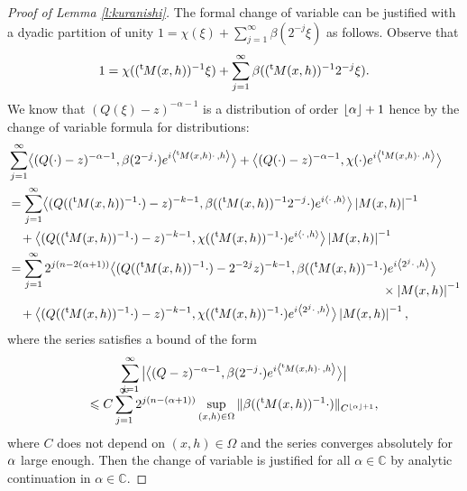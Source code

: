 \documentclass[10pt]{amsart}
\theoremstyle{definition}
\newenvironment{refproof}[1]{\begin{proof}[Proof of {#1}]}{\end{proof}}
\let\cv\alpha
\let\Re\relax
\DeclareMathOperator{\Re}{Re}
\newcommand{\module}[1]{\left|#1\right|}
\newcommand{\plancher}[1]{\left \lfloor #1 \right \rfloor }
\newcommand\fantom{\\ &\phantom{=}\,}
\renewcommand{\t}{{{}^{\mathrm{t}\mkern-2mu}}}
\begin{document}
\begin{refproof}{Lemma \ref{l:kuranishi}}
The formal change of variable can be justified with a dyadic partition of unity $1=\chi(\xi)+\sum_{j=1}^\infty \beta(2^{-j}\xi)$ as follows.
Observe that
\[
1=\chi((\t M(x,h))^{-1}\xi)+\sum_{j=1}^\infty \beta((\t M(x,h))^{-1}2^{-j}\xi).
\]
We know that
$\left(Q(\xi)-z \right)^{-\cv-1}$ is a distribution of order $\plancher{\Re \cv}+1$ hence by the change of variable formula for
distributions:
\[
\begin{aligned}
&\sum_{j=1}^\infty\bigl\langle (Q(\cdot)-z)^{-\cv-1},\beta(2^{-j}\cdot) e^{i\left\langle \t M(x,h)\cdot\,,h\right\rangle} \bigr\rangle+\bigl\langle (Q(\cdot)-z)^{-\cv-1},\chi(\cdot) e^{i\left\langle \t M(x,h)\cdot\,,h\right\rangle} \bigr\rangle \\
&=\sum_{j=1}^\infty\bigl\langle (Q((\t M(x,h))^{-1}\cdot)-z)^{-k-1},\beta((\t M(x,h))^{-1}2^{-j}\cdot) e^{i\left\langle\cdot\,,h\right\rangle} \bigr\rangle \module{M(x,h)}^{-1}
\fantom + \bigl\langle (Q((\t M(x,h))^{-1}\cdot)-z)^{-k-1},\chi((\t M(x,h))^{-1}\cdot) e^{i\left\langle\cdot\,,h\right\rangle} \bigr\rangle \module{M(x,h)}^{-1}\\
&=\sum_{j=1}^\infty 2^{j(n-2(\cv+1))}\bigl\langle (Q((\t M(x,h))^{-1}\cdot)-2^{-2j}z)^{-k-1},\beta((\t M(x,h))^{-1}\cdot) e^{i\left\langle 2^j\cdot\,,h\right\rangle}\bigr\rangle\\[-10pt]
&\hspace*{10.5cm} \times\module{M(x,h)}^{-1}
\fantom + \bigl\langle (Q((\t M(x,h))^{-1}\cdot)-z)^{-k-1},\chi((\t M(x,h))^{-1}\cdot) e^{i\left\langle 2^j\cdot\,,h\right\rangle}\bigr\rangle \module{M(x,h)}^{-1},
\end{aligned}
\]
where the series satisfies a bound of the form
\begin{multline*}
\sum_{j=1}^\infty \big| \bigl\langle (Q-z)^{-\cv-1},\beta(2^{-j}\cdot) e^{i\left\langle \t M(x,h)\cdot\,,h\right\rangle} \bigr\rangle\big| \\[-10pt]\leqslant C \sum_{j=1}^\infty 2^{j(n-(\Re\cv+1))} \sup_{(x,h)\in \Omega} \Vert \beta((\t M(x,h))^{-1}\cdot)\Vert_{C^{\plancher{\Re\cv}+1}},
\end{multline*}
where $C$ does not depend on $(x,h)\in \Omega$ and the series converges absolutely for $\Re\cv$ large enough.
Then the change of variable is justified for all $\cv\in \mathbb{C}$ by analytic continuation in $\cv\in \mathbb{C}$.
\end{refproof}
\end{document}
